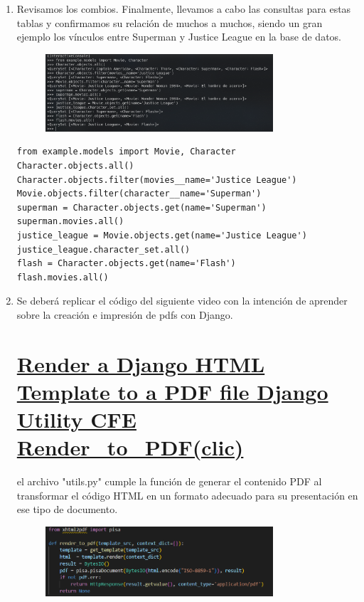 \documentclass{article}
\begin{document}
\begin{enumerate}
\begin{figure}[H]
	\end{figure}		
  \item Revisamos los combios. Finalmente, llevamos a cabo las consultas para estas tablas y confirmamos su relación de muchos a muchos, siendo un gran ejemplo los vínculos entre Superman y Justice League en la base de datos.
\begin{figure}[H]
		\centering
		\includegraphics[width=0.8\textwidth,keepaspectratio]{img/Ejercicio2/3.png}
	\end{figure}
\begin{lstlisting}
from example.models import Movie, Character
Character.objects.all()
Character.objects.filter(movies__name='Justice League')
Movie.objects.filter(character__name='Superman')
superman = Character.objects.get(name='Superman')
superman.movies.all()
justice_league = Movie.objects.get(name='Justice League')
justice_league.character_set.all()
flash = Character.objects.get(name='Flash')
flash.movies.all()
\end{lstlisting}
  \item Se deberá replicar el código del siguiente video con la intención de aprender sobre la creación e impresión de pdfs con Django.
\setcounter{secnumdepth}{0}
\section{\normalfont\small\href{https://drive.google.com/file/d/1btSc7p5O_ll0CBdiLokWi89lq5yXahoN/view}{Render a Django HTML Template to a PDF file Django Utility CFE Render_to_PDF(clic)}}

\begin{description}
[--]  el archivo "utils.py" cumple la función de generar el contenido PDF al transformar el código HTML en un formato adecuado para su presentación en ese tipo de documento.
\begin{figure}[H]
		\centering
		\includegraphics[width=0.8\textwidth,keepaspectratio]{img/Ejercicio3/1.png}
	\end{figure}


\end{description}
\end{enumerate}
\end{document}
